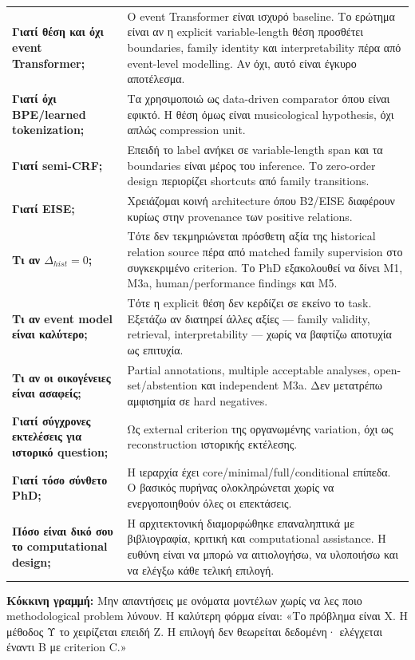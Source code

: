 \documentclass[9pt,a4paper]{extarticle}
\begin{document}
\small
\begin{tabularx}{\linewidth}{>{\bfseries}p{5.0cm}X}
Γιατί θέση και όχι event Transformer; & Ο event Transformer είναι ισχυρό baseline. Το ερώτημα είναι αν η explicit variable-length θέση προσθέτει boundaries, family identity και interpretability πέρα από event-level modelling. Αν όχι, αυτό είναι έγκυρο αποτέλεσμα.\\[2mm]
Γιατί όχι BPE/learned tokenization; & Τα χρησιμοποιώ ως data-driven comparator όπου είναι εφικτό. Η θέση όμως είναι musicological hypothesis, όχι απλώς compression unit.\\[2mm]
Γιατί semi-CRF; & Επειδή το label ανήκει σε variable-length span και τα boundaries είναι μέρος του inference. Το zero-order design περιορίζει shortcuts από family transitions.\\[2mm]
Γιατί EISE; & Χρειάζομαι κοινή architecture όπου B2/EISE διαφέρουν κυρίως στην provenance των positive relations.\\[2mm]
Τι αν \(\Delta_{hist}=0\); & Τότε δεν τεκμηριώνεται πρόσθετη αξία της historical relation source πέρα από matched family supervision στο συγκεκριμένο criterion. Το PhD εξακολουθεί να δίνει M1, M3a, human/performance findings και M5.\\[2mm]
Τι αν event model είναι καλύτερο; & Τότε η explicit θέση δεν κερδίζει σε εκείνο το task. Εξετάζω αν διατηρεί άλλες αξίες — family validity, retrieval, interpretability — χωρίς να βαφτίζω αποτυχία ως επιτυχία.\\[2mm]
Τι αν οι οικογένειες είναι ασαφείς; & Partial annotations, multiple acceptable analyses, open-set/abstention και independent M3a. Δεν μετατρέπω αμφισημία σε hard negatives.\\[2mm]
Γιατί σύγχρονες εκτελέσεις για ιστορικό question; & Ως external criterion της οργανωμένης variation, όχι ως reconstruction ιστορικής εκτέλεσης.\\[2mm]
Γιατί τόσο σύνθετο PhD; & Η ιεραρχία έχει core/minimal/full/conditional επίπεδα. Ο βασικός πυρήνας ολοκληρώνεται χωρίς να ενεργοποιηθούν όλες οι επεκτάσεις.\\[2mm]
Πόσο είναι δικό σου το computational design; & Η αρχιτεκτονική διαμορφώθηκε επαναληπτικά με βιβλιογραφία, κριτική και computational assistance. Η ευθύνη είναι να μπορώ να αιτιολογήσω, να υλοποιήσω και να ελέγξω κάθε τελική επιλογή.\\
\end{tabularx}
\normalsize

\begin{redline}
\textbf{Κόκκινη γραμμή:} Μην απαντήσεις με ονόματα μοντέλων χωρίς να λες ποιο methodological problem λύνουν. Η καλύτερη φόρμα είναι: «Το πρόβλημα είναι Χ. Η μέθοδος Υ το χειρίζεται επειδή Ζ. Η επιλογή δεν θεωρείται δεδομένη· ελέγχεται έναντι Β με criterion C.»
\end{redline}
\end{document}
